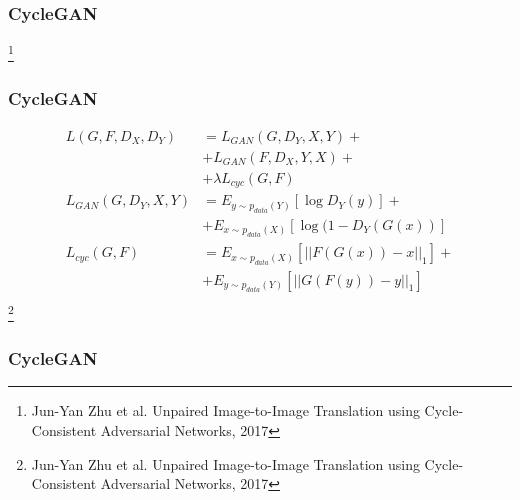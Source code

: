 \documentclass[14pt,aspectratio=169]{beamer}
\newcommand\blfootnote[1]{%
  \begingroup
  \renewcommand\thefootnote{}\footnote{#1}%
  \addtocounter{footnote}{-1}%
  \endgroup
}
\begin{document}
\begin{frame}
\frametitle{CycleGAN}
\blfootnote{Jun-Yan Zhu et al. Unpaired Image-to-Image Translation
using Cycle-Consistent Adversarial Networks, 2017}
\end{frame}

\begin{frame}
\frametitle{CycleGAN}
\begin{align*}
  L(G, F, D_X, D_Y) &= L_{GAN}(G, D_Y, X, Y) + \\
  & + L_{GAN}(F, D_X, Y, X) + \\
  & + \lambda L_{cyc}(G, F)\\
  L_{GAN}(G, D_Y, X, Y) & = E_{y \sim p_{data}(Y)}[\log D_Y(y)] +\\
  & + E_{x \sim p_{data}(X)}[\log(1 - D_Y(G(x))]\\
  L_{cyc}(G, F) & = E_{x \sim p_{data}(X)}[||F(G(x)) - x||_1] +\\
  & + E_{y \sim p_{data}(Y)}[||G(F(y)) - y||_1]\\
\end{align*}
\blfootnote{Jun-Yan Zhu et al. Unpaired Image-to-Image Translation
using Cycle-Consistent Adversarial Networks, 2017}
\end{frame}

\begin{frame}
\frametitle{CycleGAN}

\begin{figure}
\centering
{}
\end{figure}
\end{frame}
\end{document}
